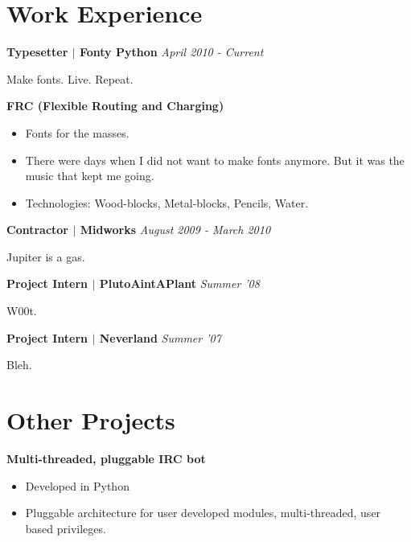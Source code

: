 \documentclass{article}
\begin{document}
\begin{minipage}[c]{0.6\textwidth}

\section*{{\color{green} Work Experience}}

\begin{description}

\item
{\bfseries Typesetter $ \mid $ Fonty Python} \textit{April 2010 - Current}

Make fonts. Live. Repeat.

{\bfseries FRC (Flexible Routing and Charging)}
\begin{itemize}\addtolength{\itemsep}{-0.4\baselineskip}
\item Fonts for the masses.
\item There were days when I did not want to make fonts anymore. But it was the music that kept me going.
\item Technologies: Wood-blocks, Metal-blocks, Pencils, Water.
\end{itemize}

\item
{\bfseries Contractor  $ \mid $ Midworks} \textit{August 2009 - March 2010}

Jupiter is a gas.

\item
{\bfseries Project Intern  $ \mid $ PlutoAintAPlant}  \textit{Summer '08}

W00t.

\item
{\bfseries Project Intern  $ \mid $ Neverland} \textit{Summer '07}

Bleh.

\end{description}

\section*{{\color{green} Other Projects}}

\begin{description}

\item {\bfseries Multi-threaded, pluggable IRC bot}
\begin{itemize}\addtolength{\itemsep}{-0.4\baselineskip}
\item Developed in Python
\item Pluggable architecture for user developed modules, multi-threaded, user based privileges.
\end{itemize}


\end{description}

\end{minipage}
\end{document}
